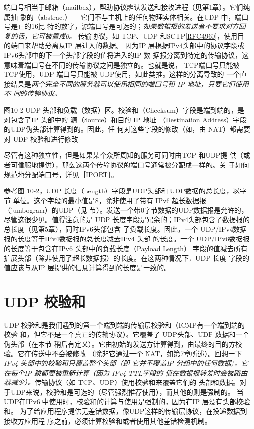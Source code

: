 端口号相当于邮箱（mailbox），帮助协议辨认发送和接收进程（见第1章）。它们纯属抽
象的（abstract）—-它们不与主机上的任何物理实体相关。在UDP 中，端口号是正的16比
特的数字，源端口号是可选的；\emph{如果数据报的发送者不要求对方回复的话，它可被置成0。}
传输协议，如 TCP、UDP 和SCTP\href{https://www.rfc-editor.org/rfc/rfc4960}{[RFC4960]}，使用目的端口来帮助分离从IP 层进入的数据。
因为IP 层根据IPv4头部中的协议字段或IPv6头部中的下一个头部字段的值将进入的IP 数
据报分离到特定的传输协议，这意味着端口号在不同的传输协议之间是独立的。也就是说，
TCP端口号只能被 TCP使用，UDP 端口号只能被 UDP使用，如此类推。这样的分离导致的
一个直接结果是\emph{两个完全不同的服务器可以使用相同的端口号和 IP 地址，只要它们使用不
同的传输协议。}

图10-2 UDP 头部和负载（数据）区。校验和（Checksum）字段是端到端的，是对包含了IP 头部中的
源（Source）和目的 IP 地址 （Destination Address）字段的UDP伪头部计算得到的。因此，任
何对这些字段的修改（如，由 NAT）都需要对 UDP 校验和进行修改

\begin{tcolorbox}    
    尽管有这种独立性，但是如果某个众所周知的服务可同时由TCP 和UDP提
    供（或者可信服地提供），那么这两个传输协议的端口号通常被分配成一样的。关
    于如何规范地分配端口号，详见［IPORT］。
\end{tcolorbox}

参考图 10-2，UDP 长度（Length）字段是UDP头部和 UDP数据的总长度，以字节
单位。这个字段的最小值是8，除非使用了带有 IPv6 超长数据报（jumbogram）的UDP（见
节）。发送一个带0字节数据的UDP数据报是允许的，尽管这很少见。值得注意的是
UDP 长度字段是冗余的；IPv4头部包含了数据报的总长度（见第5章），同时IPv6头部包含
了负载长度。因此，一个 UDP/IPv4数据报的长度等于IPv4数据报的总长度减去IPv4 头部
的长度。一个 UDP/IPv6数据报的长度等于包含在IPv6 头部中的负载长度（Payload Length）
字段的值减去所有扩展头部（除非使用了超长数据报）的长度。在这两种情况下，UDP 长度
字段的值应该与从IP 层提供的信息计算得到的长度是一致的。

\section{UDP 校验和}
UDP 校验和是我们遇到的第一个端到端的传输层校验和（ICMP有一个端到端的校验
和，但它不是一个真正的传输协议）。它覆盖了 UDP头部、UDP 数据和一个伪头部（在本节
稍后有定义）。它由初始的发送方计算得到，由最终的目的方校验。它在传送中不会被修改
（除非它通过一个 NAT，如第7章所述）。回想一下\emph{ IPv4 头部中的校验和只覆盖整个头部（即
它并不覆盖IP 分组中的任何数据），它在每个IP 跳都要被重新计算（因为 IPv4 TTL字段的
值在数据报转发时会被路由器减少）。}传输协议（如 TCP、UDP）使用校验和来覆盖它们的
头部和数据。对于UDP来说，校验和是可选的（尽管强烈推荐使用），而其他的则是强制的。
当UDP在IPv6 中使用时，校验和的计算与使用是强制的，因为在IP 层没有头部校验和。
为了给应用程序提供无差错数据，像UDP这样的传输层协议，在投递数据到接收方应用程
序之前，必须计算校验和或者使用其他差错检测机制。

